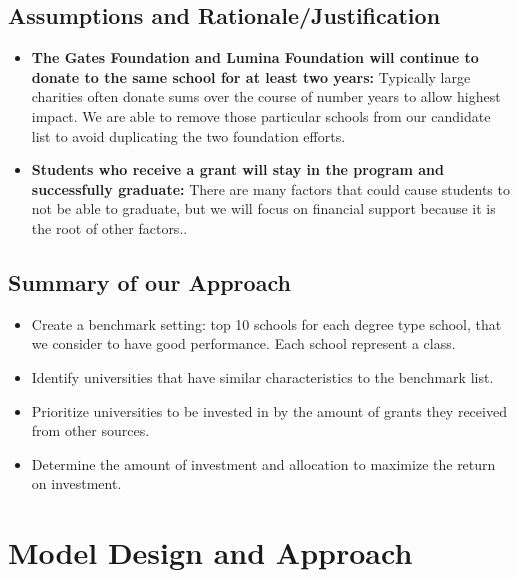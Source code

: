 \documentclass[12pt]{scrartcl}
\begin{document}
	\subsection{Assumptions and Rationale/Justification}
	\begin{itemize}
		\item \textbf{The Gates Foundation and Lumina Foundation will continue to donate to the same school for at least two years:} Typically large charities often donate sums over the course of number years to allow highest impact. \cite{Conkey} We are able to remove those particular schools from our candidate list to avoid duplicating the two foundation efforts. 
				
		\item \textbf{Students who receive a grant will stay in the program and successfully graduate:} There are many factors that could cause students to not be able to graduate, but we will focus on financial support because it is the root of other factors..\cite{Trom}

	\end{itemize}
	
	\subsection{Summary of our Approach}
		\begin{itemize}
		\item Create a benchmark setting: top 10 schools for each degree type school, that we consider to have good performance. Each school represent a class.  
		\item Identify universities that have similar characteristics to the benchmark list. 
		\item Prioritize universities to be invested in by the amount of grants they received from other sources.
		\item Determine the amount of investment and allocation to maximize the return on investment. 
		\end{itemize}
				 
\clearpage
\section{Model Design and Approach}
\end{document}
